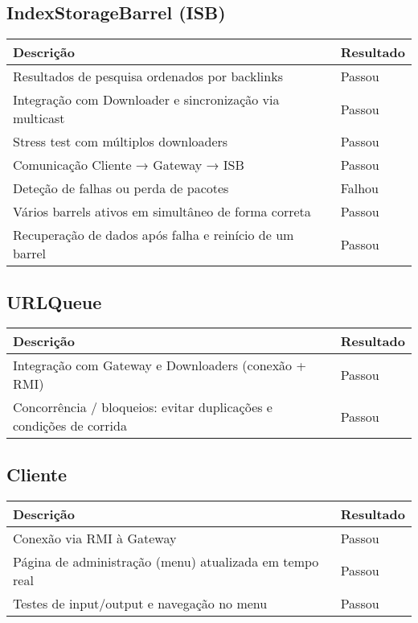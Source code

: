 \documentclass{article}
\begin{document}
\vspace{1em}
\subsection{IndexStorageBarrel (ISB)}

\begin{tabularx}{\textwidth}{X l}
\toprule
\textbf{Descrição} & \textbf{Resultado} \\
\midrule
Resultados de pesquisa ordenados por backlinks & Passou \\
Integração com Downloader e sincronização via multicast & Passou \\
Stress test com múltiplos downloaders & Passou \\
Comunicação Cliente → Gateway → ISB & Passou \\
Deteção de falhas ou perda de pacotes & Falhou \\
Vários barrels ativos em simultâneo de forma correta & Passou \\
Recuperação de dados após falha e reinício de um barrel & Passou \\
\bottomrule
\end{tabularx}

\vspace{1em}
\subsection{URLQueue}

\begin{tabularx}{\textwidth}{X l}
\toprule
\textbf{Descrição} & \textbf{Resultado} \\
\midrule
Integração com Gateway e Downloaders (conexão + RMI) & Passou \\
Concorrência / bloqueios: evitar duplicações e condições de corrida & Passou \\
\bottomrule
\end{tabularx}

\vspace{1em}
\subsection{Cliente}

\begin{tabularx}{\textwidth}{X l}
\toprule
\textbf{Descrição} & \textbf{Resultado} \\
\midrule
Conexão via RMI à Gateway & Passou \\
Página de administração (menu) atualizada em tempo real & Passou \\
Testes de input/output e navegação no menu & Passou \\
\bottomrule
\end{tabularx}
\end{document}
